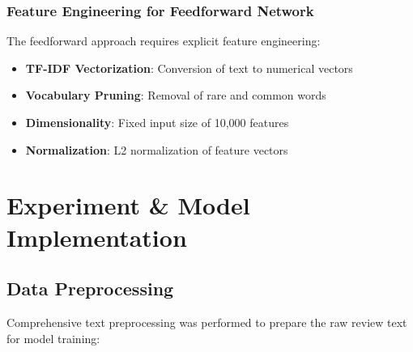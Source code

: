 \documentclass[a4paper, journal]{IEEEtran}
\begin{document}
\subsubsection{Feature Engineering for Feedforward Network}

The feedforward approach requires explicit feature engineering:

\begin{itemize}
    \item \textbf{TF-IDF Vectorization}: Conversion of text to numerical vectors
    \item \textbf{Vocabulary Pruning}: Removal of rare and common words
    \item \textbf{Dimensionality}: Fixed input size of 10,000 features
    \item \textbf{Normalization}: L2 normalization of feature vectors
\end{itemize}

\section{Experiment \& Model Implementation}

\subsection{Data Preprocessing}

Comprehensive text preprocessing was performed to prepare the raw review text for model training:
\end{document}
